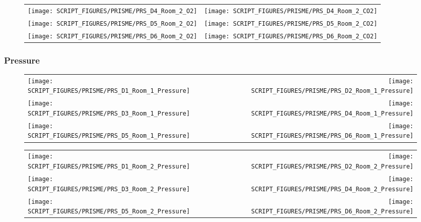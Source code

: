 \begin{figure}[p]
\begin{tabular*}{\textwidth}{l@{\extracolsep{\fill}}r}
\texttt{[image: SCRIPT\_FIGURES/PRISME/PRS\_D4\_Room\_2\_O2]} &
\texttt{[image: SCRIPT\_FIGURES/PRISME/PRS\_D4\_Room\_2\_CO2]} \\
\texttt{[image: SCRIPT\_FIGURES/PRISME/PRS\_D5\_Room\_2\_O2]} &
\texttt{[image: SCRIPT\_FIGURES/PRISME/PRS\_D5\_Room\_2\_CO2]} \\
\texttt{[image: SCRIPT\_FIGURES/PRISME/PRS\_D6\_Room\_2\_O2]} &
\texttt{[image: SCRIPT\_FIGURES/PRISME/PRS\_D6\_Room\_2\_CO2]}
\end{tabular*}
\label{PRISME_Gas_4}
\end{figure}

\clearpage

\subsubsection{Pressure}

\begin{figure}[!ht]
\begin{tabular*}{\textwidth}{l@{\extracolsep{\fill}}r}
\texttt{[image: SCRIPT\_FIGURES/PRISME/PRS\_D1\_Room\_1\_Pressure]} &
\texttt{[image: SCRIPT\_FIGURES/PRISME/PRS\_D2\_Room\_1\_Pressure]} \\
\texttt{[image: SCRIPT\_FIGURES/PRISME/PRS\_D3\_Room\_1\_Pressure]} &
\texttt{[image: SCRIPT\_FIGURES/PRISME/PRS\_D4\_Room\_1\_Pressure]} \\
\texttt{[image: SCRIPT\_FIGURES/PRISME/PRS\_D5\_Room\_1\_Pressure]} &
\texttt{[image: SCRIPT\_FIGURES/PRISME/PRS\_D6\_Room\_1\_Pressure]}
\end{tabular*}
\label{PRISME_Room_1_Pressures}
\end{figure}

\begin{figure}[p]
\begin{tabular*}{\textwidth}{l@{\extracolsep{\fill}}r}
\texttt{[image: SCRIPT\_FIGURES/PRISME/PRS\_D1\_Room\_2\_Pressure]} &
\texttt{[image: SCRIPT\_FIGURES/PRISME/PRS\_D2\_Room\_2\_Pressure]} \\
\texttt{[image: SCRIPT\_FIGURES/PRISME/PRS\_D3\_Room\_2\_Pressure]} &
\texttt{[image: SCRIPT\_FIGURES/PRISME/PRS\_D4\_Room\_2\_Pressure]} \\
\texttt{[image: SCRIPT\_FIGURES/PRISME/PRS\_D5\_Room\_2\_Pressure]} &
\texttt{[image: SCRIPT\_FIGURES/PRISME/PRS\_D6\_Room\_2\_Pressure]}
\end{tabular*}
\label{PRISME_Room_2_Pressures}
\end{figure}


